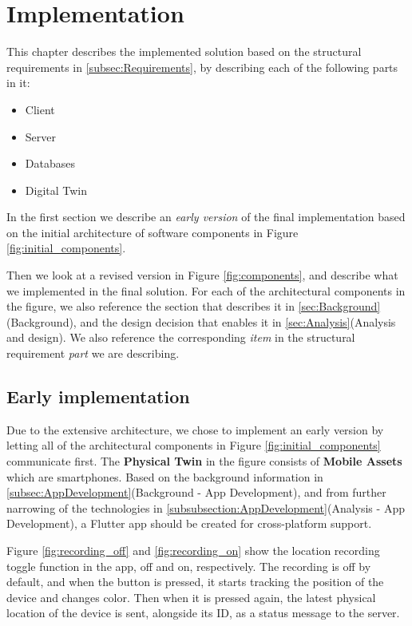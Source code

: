 \documentclass{article}
\begin{document}
\section{Implementation}\label{sec:Implementation}
This chapter describes the implemented solution based on the structural requirements in \ref{subsec:Requirements}, by describing each of the following parts in it:
\begin{itemize}
    \item Client
    \item Server
    \item Databases
    \item Digital Twin
\end{itemize}
In the first section we describe an \emph{early version} of the final implementation based on the initial architecture of software components in Figure \ref{fig:initial_components}. 

Then we look at a revised version in Figure \ref{fig:components}, and describe what we implemented in the final solution. For each of the architectural components in the figure, we also reference the section that describes it in \ref{sec:Background}(Background), and the design decision that enables it in \ref{sec:Analysis}(Analysis and design). We also reference the corresponding \emph{item} in the structural requirement \emph{part} we are describing.

\subsection{Early implementation}\label{subsec:EarlyImplementation}
Due to the extensive architecture, we chose to implement an early version by letting all of the architectural components in Figure \ref{fig:initial_components} communicate first. The \textbf{Physical Twin} in the figure consists of \textbf{Mobile Assets} which are smartphones. Based on the background information in \ref{subsec:AppDevelopment}(Background - App Development), and from further narrowing of the technologies in \ref{subsubsection:AppDevelopment}(Analysis - App Development), a Flutter app should be created for cross-platform support.

Figure \ref{fig:recording_off} and \ref{fig:recording_on} show the location recording toggle function in the app, off and on, respectively. The recording is off by default, and when the button is pressed, it starts tracking the position of the device and changes color. Then when it is pressed again, the latest physical location of the device is sent, alongside its ID, as a status message to the server.
\end{document}
